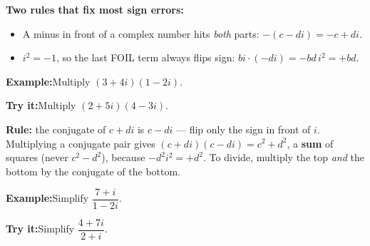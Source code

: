 \documentclass[12pt]{article}
\begin{document}

\begin{formulabox}\textbf{Two rules that fix most sign errors:}\\[4pt]
\begin{itemize}[leftmargin=1cm, itemsep=1pt, topsep=2pt]
  \item A minus in front of a complex number hits \emph{both} parts:
        $-(c - di) = -c + di$.
  \item $i^2 = -1$, so the last FOIL term always flips sign:
        $bi \cdot (-di) = -bd\,i^2 = +bd$.
\end{itemize}
\end{formulabox}
\begin{examplebox}\textbf{Example:}\quad Multiply $(3 + 4i)(1 - 2i)$.
\end{examplebox}
\begin{tryitbox}\textbf{Try it:}\quad Multiply $(2 + 5i)(4 - 3i)$.\\[2pt]
\end{tryitbox}

\begin{formulabox}\textbf{Rule:} the conjugate of $c + di$ is $c - di$ --- flip only the
sign in front of $i$. Multiplying a conjugate pair gives
$(c + di)(c - di) = c^2 + d^2$, a \textbf{sum} of squares (never $c^2 - d^2$), because
$-d^2i^2 = +d^2$. To divide, multiply the top \emph{and} the bottom by the conjugate
of the bottom.
\end{formulabox}
\begin{examplebox}\textbf{Example:}\quad Simplify $\dfrac{7 + i}{1 - 2i}$.
\end{examplebox}
\begin{tryitbox}\textbf{Try it:}\quad Simplify $\dfrac{4 + 7i}{2 + i}$.\\[2pt]
\end{tryitbox}
\end{document}
